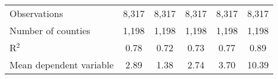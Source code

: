 {\begin{tabular}{l*{5}{c}}
\midrule
Observations        &       8,317         &       8,317         &       8,317         &       8,317         &       8,317         \\
Number of counties  &       1,198         &       1,198         &       1,198         &       1,198         &       1,198         \\
R$^2$               &        0.78         &        0.72         &        0.73         &        0.77         &        0.89         \\
Mean dependent variable&        2.89         &        1.38         &        2.74         &        3.70         &       10.39         \\
\bottomrule
\end{tabular}
}

